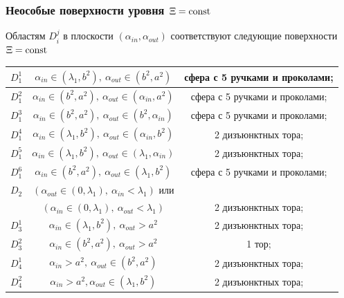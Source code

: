 \begin{frame}\frametitle{Неособые поверхности уровня $\Xi=\mathrm{const}$}
\begin{mytheorem} 
Областям $D_i^j$ в плоскости $(\alpha_{in}, \alpha_{out})$ соответствуют следующие поверхности $\Xi = \mathrm{const}$
\medskip
\begin{center}
\begin{tabular}{|c|c|c|}
\hline 
$D_1^1$  	& 	$\alpha_{in} \in (\lambda_1, b^2), \ \alpha_{out} \in (b^2, a^2)$			& сфера с 5 ручками и проколами; \\ \hline 
$D_1^2$  	& 	$\alpha_{in} \in (b^2, a^2), \ \alpha_{out} \in (\alpha_{in}, a^2)$				& сфера с 5 ручками  и проколами; \\ \hline 
$D_1^3$  	& 	$\alpha_{in} \in (b^2, a^2), \ \alpha_{out} \in (b^2, \alpha_{in})$				& сфера с 5 ручками  и проколами; \\ \hline 
$D_1^4$ 	& 	$\alpha_{in} \in (\lambda_1, b^2), \ \alpha_{out} \in (\alpha_{in}, b^2)$	& 2 дизъюнктных тора; \\ \hline 
$D_1^5$  	& 	$\alpha_{in} \in (\lambda_1, b^2), \ \alpha_{out} \in (\lambda_1, \alpha_{in})$	& 2 дизъюнктных тора; \\ \hline 
$D_1^6$  	& 	$\alpha_{in} \in (b^2, a^2), \ \alpha_{out} \in (\lambda_1, b^2)$			& сфера с 5 ручками  и проколами; \\ \hline 
\hline
$D_2$  	& 	$(\alpha_{out} \in (0, \lambda_1), \ \alpha_{in} < \lambda_1)$ или & \\
		&  $(\alpha_{in} \in (0, \lambda_1), \ \alpha_{out} < \lambda_1)$				& 2 дизъюнктных тора; \\ \hline
 \hline
$D_3^1$  	& 	$\alpha_{in} \in (\lambda_1, b^2), \ \alpha_{out} > a^2$				& 2 дизъюнктных тора; \\ \hline 
$D_3^2$  	& 	$\alpha_{in} \in (b^2, a^2), \ \alpha_{out} > a^2 $					& 1 тор; \\ \hline 
\hline 
$D_4^1$  	& 	$\alpha_{in} > a^2, \ \alpha_{out} \in (b^2, a^2)$						& 2 дизъюнктных тора; \\ \hline 
$D_4^2$  	& 	$\alpha_{in} > a^2, \alpha_{out} \in (\lambda_1, b^2)$				& 2 дизъюнктных тора; \\ \hline 
\end{tabular}
\end{center}
\label{st:n1_n2_surfaces}
\end{mytheorem} 

\end{frame}

